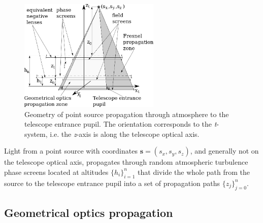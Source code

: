 \begin{figure}[htp]
\begin{center}
 \includegraphics[width = 0.6\textwidth]{Propagation.png}
\end{center}
\caption{Geometry of point source propagation through atmosphere to the
telescope entrance pupil. The orientation corresponds to the \emph{t}-system,
i.e. the \emph{z}-axis is along the telescope optical axis.}
\label{fig:propagation-geometry}
\end{figure}

Light from a point source with coordinates $\bm{s} = (s_{x},s_{y},s_{z})$, and
generally not on the telescope optical axis, propagates through random
atmospheric turbulence phase screens located at altitudes $\{ h_{i}
\}_{i=1}^{n}$ that divide the whole path from the source to the telescope
entrance pupil into a set of propagation paths $\{ z_{j} \}_{j=0}^{n}$.

\subsection{Geometrical optics propagation}

